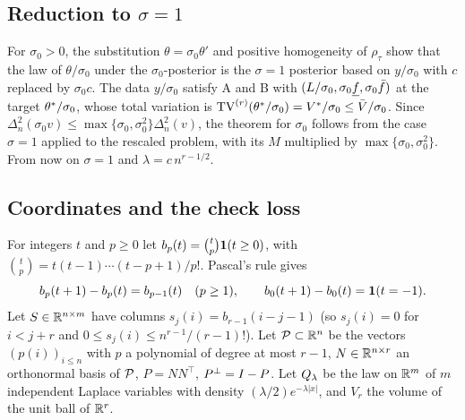 \subsection{Reduction to $\sigma=1$}\label{pf:sec:reduction}

For $\sigma_0>0$, the substitution $\theta=\sigma_0\theta'$ and positive homogeneity of $\rho_\tau$ show that the law of $\theta/\sigma_0$ under the $\sigma_0$-posterior is the $\sigma=1$ posterior based on $y/\sigma_0$ with $c$ replaced by $\sigma_0c$. The data $y/\sigma_0$ satisfy A and B with $(L/\sigma_0,\sigma_0\underline f,\sigma_0\bar f)$ at the target $\theta^{*}/\sigma_0$, whose total variation is $\mathrm{TV}^{(r)}(\theta^{*}/\sigma_0)=V^{*}/\sigma_0\le\bar V/\sigma_0$. Since $\Delta_n^2(\sigma_0v)\le\max\{\sigma_0,\sigma_0^2\}\Delta_n^2(v)$, the theorem for $\sigma_0$ follows from the case $\sigma=1$ applied to the rescaled problem, with its $M$ multiplied by $\max\{\sigma_0,\sigma_0^2\}$. From now on $\sigma=1$ and $\lambda=c\,n^{r-1/2}$.

\subsection{Coordinates and the check loss}

For integers $t$ and $p\ge0$ let $b_p(t)=\binom tp\mathbf 1(t\ge0)$, with $\binom tp=t(t-1)\cdots(t-p+1)/p!$. Pascal's rule gives
\begin{equation}\label{pf:eq:pascal}
b_p(t+1)-b_p(t)=b_{p-1}(t)\quad(p\ge1),\qquad b_0(t+1)-b_0(t)=\mathbf 1(t=-1).
\end{equation}
Let $S\in\mathbb{R}^{n\times m}$ have columns $s_j(i)=b_{r-1}(i-j-1)$ (so $s_j(i)=0$ for $i<j+r$ and $0\le s_j(i)\le n^{r-1}/(r-1)!$). Let $\mathcal P\subset\mathbb{R}^n$ be the vectors $(p(i))_{i\le n}$ with $p$ a polynomial of degree at most $r-1$, $N\in\mathbb{R}^{n\times r}$ an orthonormal basis of $\mathcal P$, $P=NN^\top$, $P^{\perp}=I-P$. Let $Q_\lambda$ be the law on $\mathbb{R}^m$ of $m$ independent Laplace variables with density $(\lambda/2)e^{-\lambda|x|}$, and $V_r$ the volume of the unit ball of $\mathbb{R}^r$.


